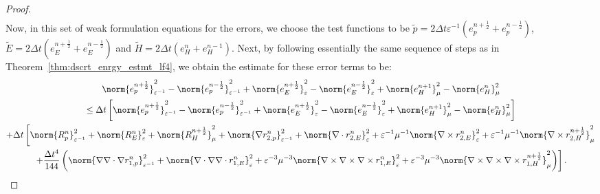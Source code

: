 \documentclass{amsart}
\theoremstyle{thmstyleone}%
\theoremstyle{thmstyletwo}%
\theoremstyle{thmstylethree}%
\begin{document}
\begin{proof}
\begin{align*}
\end{align*}
Now, in this set of weak formulation equations for the errors, we choose the test functions to be $\widetilde{p} = 2 \Delta t \varepsilon^{-1} \left( e_p^{n + \frac{1}{2}} + e_p^{n - \frac{1}{2}} \right)$, $\widetilde{E} = 2 \Delta t \left( e_E^{n + \frac{1}{2}} + e_E^{n - \frac{1}{2}} \right)$ and $\widetilde{H} = 2 \Delta t \left( e_H^n + e_H^{n - 1} \right)$. Next, by following essentially the same sequence of steps as in Theorem~\ref{thm:dscrt_enrgy_estmt_lf4}, we obtain the estimate for these error terms to be:
\begin{multline*}
  \norm{e_p^{n + \frac{1}{2}}}^2_{\varepsilon^{-1}} - \norm{e_p^{n - \frac{1}{2}}}^2_{\varepsilon^{-1}} + \norm{e_E^{n + \frac{1}{2}}}^2_{\varepsilon} - \norm{e_E^{n - \frac{1}{2}}}^2_{\varepsilon} + \norm{e_H^{n+1}}^2_{\mu} -  \norm{e_H^n}^2_{\mu} \\ \le \Delta t \left[ \norm{e_p^{n + \frac{1}{2}}}^2_{\varepsilon^{-1}} - \norm{e_p^{n - \frac{1}{2}}}^2_{\varepsilon^{-1}} + \norm{e_E^{n + \frac{1}{2}}}^2_{\varepsilon} - \norm{e_E^{n - \frac{1}{2}}}^2_{\varepsilon} + \norm{e_H^{n+1}}^2_{\mu} -  \norm{e_H^n}^2_{\mu}\right] \\ +
 \Delta t \left[ \norm{R_p^n}^2_{\varepsilon^{-1}} + \norm{R_E^n}^2_{\varepsilon} + \norm{R_H^{n + \frac{1}{2}}}^2_{\mu} + \norm{\nabla r_{2,p}^n} ^2_{\varepsilon^{-1}} + \norm{\nabla \cdot r_{2,E}^n}^2_{\varepsilon} + \varepsilon^{-1} \mu^{-1} \norm{\nabla \times r_{2,E}^n}^2_{\varepsilon} +  \varepsilon^{-1} \mu^{-1} \norm{\nabla \times r_{2,H}^{n + \frac{1}{2}}}^2_{\mu} \right. \\ 
\left. + \dfrac{\Delta t^4}{144} \left( \norm{\nabla \nabla \cdot \nabla r_{1,p}^n} ^2_{\varepsilon^{-1}} + \norm{\nabla \cdot \nabla \nabla \cdot r_{1,E}^n}^2_{\varepsilon} + \varepsilon^{-3} \mu^{-3} \norm{\nabla \times \nabla \times \nabla \times r_{1,E}^n}^2_{\varepsilon} +  \varepsilon^{-3} \mu^{-3} \norm{\nabla \times \nabla \times \nabla \times r_{1,H}^{n + \frac{1}{2}}}^2_{\mu} \right) \right].
\end{multline*}


\end{proof}
\end{document}
